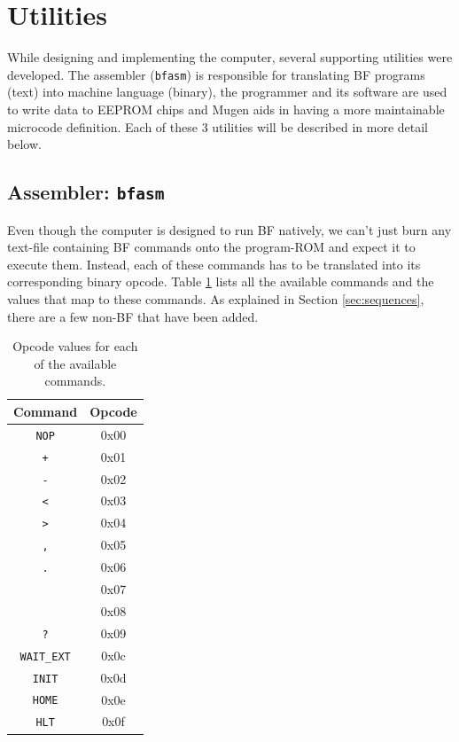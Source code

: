 \section{Utilities} \label{sec:utilities}
While designing and implementing the computer, several supporting utilities were developed. The assembler (\texttt{bfasm}) is responsible for translating BF programs (text) into machine language (binary), the programmer and its software are used to write data to EEPROM chips and Mugen aids in having a more maintainable microcode definition. Each of these 3 utilities will be described in more detail below.

\subsection{Assembler: \texttt{bfasm}} \label{sec:utilities:bfasm}
Even though the computer is designed to run BF natively, we can't just burn any text-file containing BF commands onto the program-ROM and expect it to execute them. Instead, each of these commands has to be translated into its corresponding binary opcode. Table \ref{tab:opcodes} lists all the available commands and the values that map to these commands. As explained in Section \ref{sec:sequences}, there are a few non-BF that have been added.

\begin{table}[H]
  \centering
  \begin{tabular}{c|c}
    Command & Opcode \\ \hline
    \texttt{NOP} & 0x00 \\
    \texttt{+} & 0x01 \\
    \texttt{-} & 0x02 \\
    \texttt{<} & 0x03 \\
    \texttt{>} & 0x04 \\
    \texttt{,} & 0x05 \\
    \texttt{.} & 0x06 \\
    \texttt{\detokenize{[}} & 0x07 \\
    \texttt{\detokenize{]}} & 0x08 \\
    \texttt{?} & 0x09 \\
    \texttt{WAIT\_EXT} & 0x0c \\
    \texttt{INIT} & 0x0d \\
    \texttt{HOME} & 0x0e \\
    \texttt{HLT}  & 0x0f 
  \end{tabular}
  \caption{Opcode values for each of the available commands.}
  \label{tab:opcodes}
\end{table}

